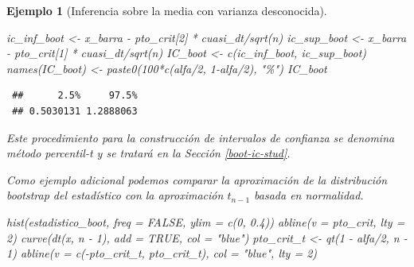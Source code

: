 \documentclass[
]{book}
\newenvironment{Shaded}{\begin{snugshade}}{\end{snugshade}}
\newcommand{\AttributeTok}[1]{\textcolor[rgb]{0.77,0.63,0.00}{#1}}
\newcommand{\ConstantTok}[1]{\textcolor[rgb]{0.00,0.00,0.00}{#1}}
\newcommand{\DecValTok}[1]{\textcolor[rgb]{0.00,0.00,0.81}{#1}}
\newcommand{\FloatTok}[1]{\textcolor[rgb]{0.00,0.00,0.81}{#1}}
\newcommand{\FunctionTok}[1]{\textcolor[rgb]{0.00,0.00,0.00}{#1}}
\newcommand{\NormalTok}[1]{#1}
\newcommand{\OtherTok}[1]{\textcolor[rgb]{0.56,0.35,0.01}{#1}}
\newcommand{\SpecialCharTok}[1]{\textcolor[rgb]{0.00,0.00,0.00}{#1}}
\newcommand{\StringTok}[1]{\textcolor[rgb]{0.31,0.60,0.02}{#1}}
\theoremstyle{break}
\newtheorem{example}{Ejemplo}[chapter]
\theoremstyle{nonumberplain}
\begin{document}
\begin{example}[Inferencia sobre la media con varianza desconocida]
\begin{Shaded}
\begin{Highlighting}[]
\NormalTok{ic\_inf\_boot }\OtherTok{\textless{}{-}}\NormalTok{ x\_barra }\SpecialCharTok{{-}}\NormalTok{ pto\_crit[}\DecValTok{2}\NormalTok{] }\SpecialCharTok{*}\NormalTok{ cuasi\_dt}\SpecialCharTok{/}\FunctionTok{sqrt}\NormalTok{(n)}
\NormalTok{ic\_sup\_boot }\OtherTok{\textless{}{-}}\NormalTok{ x\_barra }\SpecialCharTok{{-}}\NormalTok{ pto\_crit[}\DecValTok{1}\NormalTok{] }\SpecialCharTok{*}\NormalTok{ cuasi\_dt}\SpecialCharTok{/}\FunctionTok{sqrt}\NormalTok{(n)}
\NormalTok{IC\_boot }\OtherTok{\textless{}{-}} \FunctionTok{c}\NormalTok{(ic\_inf\_boot, ic\_sup\_boot)}
\FunctionTok{names}\NormalTok{(IC\_boot) }\OtherTok{\textless{}{-}} \FunctionTok{paste0}\NormalTok{(}\DecValTok{100}\SpecialCharTok{*}\FunctionTok{c}\NormalTok{(alfa}\SpecialCharTok{/}\DecValTok{2}\NormalTok{, }\DecValTok{1}\SpecialCharTok{{-}}\NormalTok{alfa}\SpecialCharTok{/}\DecValTok{2}\NormalTok{), }\StringTok{"\%"}\NormalTok{)}
\NormalTok{IC\_boot}
\end{Highlighting}
\end{Shaded}

\begin{verbatim}
 ##      2.5%     97.5% 
 ## 0.5030131 1.2888063
\end{verbatim}

Este procedimiento para la construcción de intervalos de confianza se denomina \emph{método percentil-t} y se tratará en la Sección \ref{boot-ic-stud}.

Como ejemplo adicional podemos comparar la aproximación de la distribución bootstrap del estadístico con la aproximación \(t_{n-1}\) basada en normalidad.

\begin{Shaded}
\begin{Highlighting}[]
\FunctionTok{hist}\NormalTok{(estadistico\_boot, }\AttributeTok{freq =} \ConstantTok{FALSE}\NormalTok{, }\AttributeTok{ylim =} \FunctionTok{c}\NormalTok{(}\DecValTok{0}\NormalTok{, }\FloatTok{0.4}\NormalTok{))}
\FunctionTok{abline}\NormalTok{(}\AttributeTok{v =}\NormalTok{ pto\_crit, }\AttributeTok{lty =} \DecValTok{2}\NormalTok{)}
\FunctionTok{curve}\NormalTok{(}\FunctionTok{dt}\NormalTok{(x, n }\SpecialCharTok{{-}} \DecValTok{1}\NormalTok{), }\AttributeTok{add =} \ConstantTok{TRUE}\NormalTok{, }\AttributeTok{col =} \StringTok{"blue"}\NormalTok{)}
\NormalTok{pto\_crit\_t }\OtherTok{\textless{}{-}} \FunctionTok{qt}\NormalTok{(}\DecValTok{1} \SpecialCharTok{{-}}\NormalTok{ alfa}\SpecialCharTok{/}\DecValTok{2}\NormalTok{, n }\SpecialCharTok{{-}} \DecValTok{1}\NormalTok{)}
\FunctionTok{abline}\NormalTok{(}\AttributeTok{v =} \FunctionTok{c}\NormalTok{(}\SpecialCharTok{{-}}\NormalTok{pto\_crit\_t, pto\_crit\_t), }\AttributeTok{col =} \StringTok{"blue"}\NormalTok{, }\AttributeTok{lty =} \DecValTok{2}\NormalTok{)}
\end{Highlighting}
\end{Shaded}


\end{example}
\end{document}

